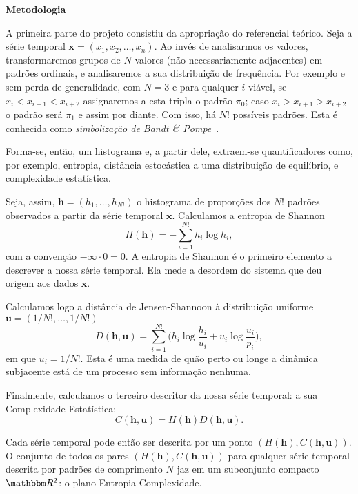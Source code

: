 \documentclass[12pt]{article}
\begin{document}
\textbf{Metodologia}

A primeira parte do projeto consistiu da apropriação do referencial teórico.
Seja a série temporal $\bm x = (x_1, x_2, \dots, x_n)$.
Ao invés de analisarmos os valores, transformaremos grupos de $N$ valores (não necessariamente adjacentes) em padrões ordinais, e analisaremos a sua distribuição de frequência.
Por exemplo e sem perda de generalidade, com $N=3$ e para qualquer $i$ viável,
se $x_i<x_{i+1}<x_{i+2}$ assignaremos a esta tripla o padrão $\pi_0$;
caso $x_i>x_{i+1}>x_{i+2}$ o padrão será $\pi_1$ e assim por diante.
Com isso, há $N!$ possíveis padrões.
Esta é conhecida como \textit{simbolização de Bandt \& Pompe}~\cite{PermutationEntropyBandtPompe}.

Forma-se, então, um histograma e, a partir dele, extraem-se quantificadores como, por exemplo, entropia, distância estocástica a uma distribuição de equilíbrio, e complexidade estatística.

Seja, assim, $\bm h=(h_1,\dots,h_{N!})$ o histograma de proporções dos $N!$ padrões observados a partir da série temporal $\bm x$.
Calculamos a entropia de Shannon
\begin{equation}
H(\bm h) = -\sum_{i=1}^{N!} h_i\log h_i,
\label{eq:Entropia}
\end{equation}
com a convenção $-\infty \cdot 0=0$.
A entropia de Shannon é o primeiro elemento a descrever a nossa série temporal.
Ela mede a desordem do sistema que deu origem aos dados $\bm x$.

Calculamos logo a distância de Jensen-Shannoon à distribuição uniforme $\bm u=(1/N!,\dots,1/N!)$
\begin{equation}
D(\bm h,\bm u) = \sum_{i=1}^{N!} \Big(h_i \log\frac{h_i}{u_i} +
u_i \log\frac{u_i}{p_i}
\Big),
\end{equation}
em que $u_i=1/N!$.
Esta é uma medida de quão perto ou longe a dinâmica subjacente está de um processo sem informação nenhuma.

Finalmente, calculamos o terceiro descritor da nossa série temporal: a sua Complexidade Estatística:
\begin{equation}
C(\bm h, \bm u) = H(\bm h) D(\bm h, \bm u).
\end{equation}

Cada série temporal pode então ser descrita por um ponto $(H(\bm h), C(\bm h, \bm u))$.
O conjunto de todos os pares $(H(\bm h), C(\bm h, \bm u))$ para qualquer série temporal descrita por padrões de comprimento $N$ jaz em um subconjunto compacto $\mathbbm R^2$: o plano Entropia-Complexidade.
\end{document}
